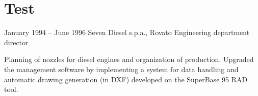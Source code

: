 \documentclass{bscv}
\begin{document}
\section{Test}
\begin{eventlist}

\item{January 1994 -- June 1996}
     {Seven Diesel s.p.a., Rovato}
     {Engineering department director}

Planning of nozzles for diesel engines and organization of production. 
Upgraded the management software by implementing a system for data
handling and automatic drawing generation (in DXF) developed on the 
SuperBase 95 RAD tool.
\end{eventlist}
   
\end{document}
